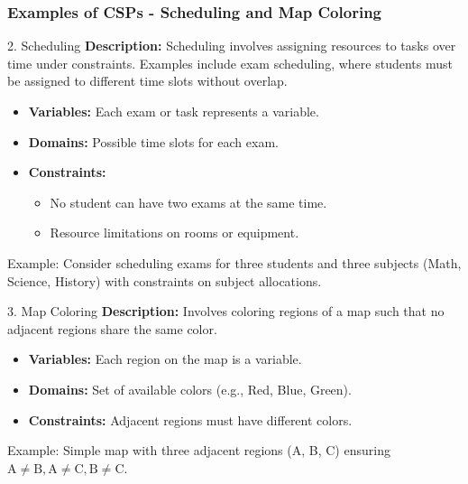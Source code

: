 \documentclass[aspectratio=169]{beamer}
\begin{document}
\begin{frame}[fragile]
    \frametitle{Examples of CSPs - Scheduling and Map Coloring}
    \begin{block}{2. Scheduling}
        \textbf{Description:} 
        Scheduling involves assigning resources to tasks over time under constraints. Examples include exam scheduling, where students must be assigned to different time slots without overlap.
    \end{block}

    \begin{itemize}
        \item \textbf{Variables:} Each exam or task represents a variable.
        \item \textbf{Domains:} Possible time slots for each exam.
        \item \textbf{Constraints:}
        \begin{itemize}
            \item No student can have two exams at the same time.
            \item Resource limitations on rooms or equipment.
        \end{itemize}
    \end{itemize}
    
    \begin{block}{Example:}
        Consider scheduling exams for three students and three subjects (Math, Science, History) with constraints on subject allocations.
    \end{block}

    \begin{block}{3. Map Coloring}
        \textbf{Description:} 
        Involves coloring regions of a map such that no adjacent regions share the same color.
    \end{block}

    \begin{itemize}
        \item \textbf{Variables:} Each region on the map is a variable.
        \item \textbf{Domains:} Set of available colors (e.g., Red, Blue, Green).
        \item \textbf{Constraints:} Adjacent regions must have different colors.
    \end{itemize}
    
    \begin{block}{Example:}
        Simple map with three adjacent regions (A, B, C) ensuring \( \text{A} \neq \text{B}, \text{A} \neq \text{C}, \text{B} \neq \text{C} \).
    \end{block}
\end{frame}
\end{document}
